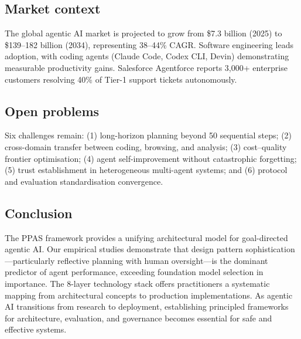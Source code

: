 \documentclass[10pt]{article}
\begin{document}
\subsection*{Market context}

The global agentic AI market is projected to grow from \$7.3 billion (2025) to \$139--182 billion (2034), representing 38--44\% CAGR\cite{grandview2025agentic}. Software engineering leads adoption, with coding agents (Claude Code, Codex CLI, Devin) demonstrating measurable productivity gains. Salesforce Agentforce reports 3,000+ enterprise customers resolving 40\% of Tier-1 support tickets autonomously.

\subsection*{Open problems}

Six challenges remain: (1) long-horizon planning beyond 50 sequential steps; (2) cross-domain transfer between coding, browsing, and analysis; (3) cost--quality frontier optimisation; (4) agent self-improvement without catastrophic forgetting; (5) trust establishment in heterogeneous multi-agent systems; and (6) protocol and evaluation standardisation convergence.

\subsection*{Conclusion}

The PPAS framework provides a unifying architectural model for goal-directed agentic AI. Our empirical studies demonstrate that design pattern sophistication---particularly reflective planning with human oversight---is the dominant predictor of agent performance, exceeding foundation model selection in importance. The 8-layer technology stack offers practitioners a systematic mapping from architectural concepts to production implementations. As agentic AI transitions from research to deployment, establishing principled frameworks for architecture, evaluation, and governance becomes essential for safe and effective systems.
\end{document}

